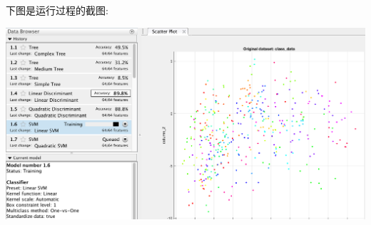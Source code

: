 下图是运行过程的截图:
	
		\begin{center}
	\begin{minipage}[t]{\linewidth}
	\center
	{
	\includegraphics[width=\MyFactor\textwidth]{Img/class_training} 
	}
	\end{minipage}
	\medskip
	\end{center}

	
		\newpage
